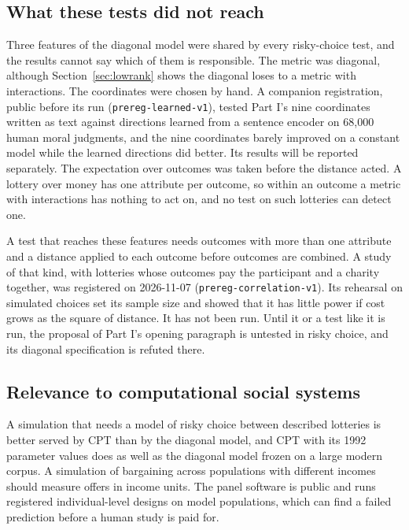 \documentclass[journal]{IEEEtran}
\begin{document}
\subsection{What these tests did not reach}
Three features of the diagonal model were shared by every risky-choice test, and the results cannot say which of them is responsible.
The metric was diagonal, although Section~\ref{sec:lowrank} shows the diagonal loses to a metric with interactions.
The coordinates were chosen by hand.
A companion registration, public before its run (\texttt{prereg-learned-v1}), tested Part I's nine coordinates written as text against directions learned from a sentence encoder on 68{,}000 human moral judgments, and the nine coordinates barely improved on a constant model while the learned directions did better.
Its results will be reported separately.
The expectation over outcomes was taken before the distance acted.
A lottery over money has one attribute per outcome, so within an outcome a metric with interactions has nothing to act on, and no test on such lotteries can detect one.

A test that reaches these features needs outcomes with more than one attribute and a distance applied to each outcome before outcomes are combined.
A study of that kind, with lotteries whose outcomes pay the participant and a charity together, was registered on 2026-11-07 (\texttt{prereg-correlation-v1}).
Its rehearsal on simulated choices set its sample size and showed that it has little power if cost grows as the square of distance.
It has not been run.
Until it or a test like it is run, the proposal of Part I's opening paragraph is untested in risky choice, and its diagonal specification is refuted there.

\subsection{Relevance to computational social systems}
A simulation that needs a model of risky choice between described lotteries is better served by CPT than by the diagonal model, and CPT with its 1992 parameter values does as well as the diagonal model frozen on a large modern corpus.
A simulation of bargaining across populations with different incomes should measure offers in income units.
The panel software is public and runs registered individual-level designs on model populations, which can find a failed prediction before a human study is paid for.

\end{document}
